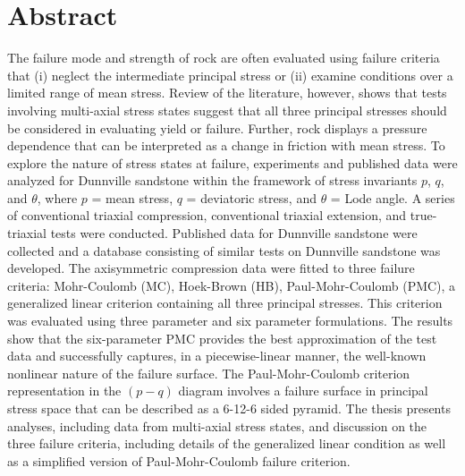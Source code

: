 

\cleardoublepage
\chapter*{Abstract}
The failure mode and strength of rock are often evaluated using failure criteria that (i) neglect the intermediate principal stress or (ii) examine conditions over a limited range of mean stress. Review of the literature, however, shows that tests involving multi-axial stress states suggest that all three principal stresses should be considered in evaluating yield or failure. Further, rock displays a pressure dependence that can be interpreted as a change in friction with mean stress. To explore the nature of stress states at failure, experiments and published data were analyzed for Dunnville sandstone within the framework of stress invariants $p$, $q$, and $\theta$, where $p$ = mean stress, $q$ = deviatoric stress, and $\theta$ = Lode angle. A series of conventional triaxial compression, conventional triaxial extension, and true-triaxial tests were conducted. Published data for Dunnville sandstone were collected and a database consisting of similar tests on Dunnville sandstone was developed. The axisymmetric compression data were fitted to three failure criteria: Mohr-Coulomb (MC), Hoek-Brown (HB), Paul-Mohr-Coulomb (PMC), a generalized linear criterion containing all three principal stresses. This criterion was evaluated using three parameter and six parameter formulations. The results show that the six-parameter PMC provides the best approximation of the test data and successfully captures, in a piecewise-linear manner, the well-known nonlinear nature of the failure surface. The Paul-Mohr-Coulomb criterion representation in the $(p-q)$ diagram involves a failure surface in principal stress space that can be described as a 6-12-6 sided pyramid. The thesis presents analyses, including data from multi-axial stress states, and discussion on the three failure criteria, including details of the generalized linear condition as well as a simplified version of Paul-Mohr-Coulomb failure criterion. 









